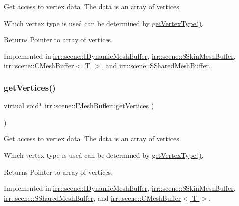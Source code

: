 Get access to vertex data. The data is an array of vertices. 

Which vertex type is used can be determined by \hyperlink{classirr_1_1scene_1_1IMeshBuffer_a4d7a84ae4416487736f0ed0f519bb4f0}{get\+Vertex\+Type()}. \begin{DoxyReturn}{Returns}
Pointer to array of vertices. 
\end{DoxyReturn}


Implemented in \hyperlink{classirr_1_1scene_1_1IDynamicMeshBuffer_a433e0e8ec301ce898dc373ca65e30e85}{irr\+::scene\+::\+I\+Dynamic\+Mesh\+Buffer}, \hyperlink{structirr_1_1scene_1_1SSkinMeshBuffer_a61271053674a773fd4afcdffafddf9b3}{irr\+::scene\+::\+S\+Skin\+Mesh\+Buffer}, \hyperlink{classirr_1_1scene_1_1CMeshBuffer_ad9463b97ee94bbc26bbb11bf867ea830}{irr\+::scene\+::\+C\+Mesh\+Buffer$<$ T $>$}, and \hyperlink{structirr_1_1scene_1_1SSharedMeshBuffer_a564b81fd7498e6df3c912e1a7dec21de}{irr\+::scene\+::\+S\+Shared\+Mesh\+Buffer}.

\mbox{\label{classirr_1_1scene_1_1IMeshBuffer_ac1695efc198b05a086487606bc2783e7}} 
\subsubsection{\texorpdfstring{get\+Vertices()}{getVertices()}\hspace{0.1cm}{\footnotesize\ttfamily [2/2]}}
{\footnotesize\ttfamily virtual void$\ast$ irr\+::scene\+::\+I\+Mesh\+Buffer\+::get\+Vertices (\begin{DoxyParamCaption}{ }\end{DoxyParamCaption})\hspace{0.3cm}{\ttfamily [pure virtual]}}



Get access to vertex data. The data is an array of vertices. 

Which vertex type is used can be determined by \hyperlink{classirr_1_1scene_1_1IMeshBuffer_a4d7a84ae4416487736f0ed0f519bb4f0}{get\+Vertex\+Type()}. \begin{DoxyReturn}{Returns}
Pointer to array of vertices. 
\end{DoxyReturn}


Implemented in \hyperlink{classirr_1_1scene_1_1IDynamicMeshBuffer_a449643505823c7cfe793c5a82cde5fa4}{irr\+::scene\+::\+I\+Dynamic\+Mesh\+Buffer}, \hyperlink{structirr_1_1scene_1_1SSkinMeshBuffer_af9671765c9d6be2b6d99878e1bdb1b9d}{irr\+::scene\+::\+S\+Skin\+Mesh\+Buffer}, \hyperlink{structirr_1_1scene_1_1SSharedMeshBuffer_a43d93dd17ede5931189376c1518ee501}{irr\+::scene\+::\+S\+Shared\+Mesh\+Buffer}, and \hyperlink{classirr_1_1scene_1_1CMeshBuffer_a9173c9d0c6f32890ab75dc501aaf5be6}{irr\+::scene\+::\+C\+Mesh\+Buffer$<$ T $>$}.

